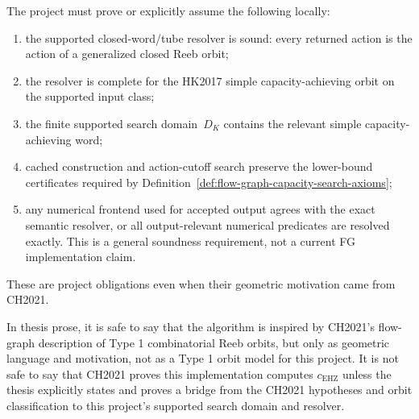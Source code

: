 \begin{remark}\label{rem:ch2021-local-obligations}
The project must prove or explicitly assume the following locally:
\begin{enumerate}
  \item the supported closed-word/tube resolver is sound: every returned action
    is the action of a generalized closed Reeb orbit;
  \item the resolver is complete for the HK2017 simple capacity-achieving orbit
    on the supported input class;
  \item the finite supported search domain~$D_K$ contains the relevant simple
    capacity-achieving word;
  \item cached construction and action-cutoff search preserve the lower-bound
    certificates required by Definition~\ref{def:flow-graph-capacity-search-axioms};
  \item any numerical frontend used for accepted output agrees with the exact
    semantic resolver, or all output-relevant numerical predicates are resolved
    exactly. This is a general soundness requirement, not a current FG
    implementation claim.
\end{enumerate}
These are project obligations even when their geometric motivation came from
CH2021.
\end{remark}

\begin{remark}\label{rem:ch2021-thesis-guardrail}
In thesis prose, it is safe to say that the algorithm is inspired by CH2021's
flow-graph description of Type 1 combinatorial Reeb orbits, but only as
geometric language and motivation, not as a Type 1 orbit model for this
project.  It is not safe to say that CH2021 proves this implementation
computes $c_{\mathrm{EHZ}}$ unless the thesis explicitly states and proves a
bridge from the CH2021 hypotheses and orbit classification to this project's
supported search domain and resolver.
\end{remark}
